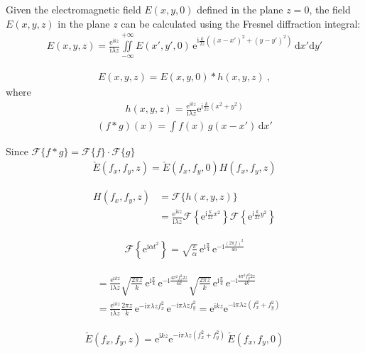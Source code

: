 \documentclass[a4paper,11pt,onecolumn]{scrartcl}
\renewcommand{\i}{\mathrm i}
\newcommand{\e}{\mathrm e}
\begin{document}
Given the electromagnetic field $E(x, y, 0)$ defined in the plane $z = 0$, the field $E(x,y,z)$ in the plane $z$ can be calculated using the Fresnel diffraction integral:
\begin{align}
E(x,y,z) = \frac{\mathrm e^{\i kz}}{\i\lambda z}\iint\limits_{-\infty}^{+\infty} E(x', y', 0)\,\e^{\i\frac{k}{2z}\left((x-x')^2 + (y-y')^2\right)\;}\mathrm dx'\mathrm dy'
\end{align}

\begin{align}
E(x,y,z) = E(x, y, 0) 
* h(x,y,z)\ ,
\end{align}
where
\begin{align}
h(x, y, z) = \frac{\mathrm e^{\i kz}}{\i\lambda z}\e^{\i\frac{k}{2z}(x^2 + y^2)}
\end{align}
\begin{align}
(f * g)(x) = \int f(x)\,g(x - x')\,\mathrm dx' 
\end{align}

Since ${\mathcal {F}}\{f*g\}={\mathcal {F}}\{f\}\cdot {\mathcal {F}}\{g\}$
\begin{align}
\check{E}(f_x, f_y, z) = \check{E}(f_x, f_y, 0)H(f_x, f_y, z)
\end{align}

\begin{align}
H(f_x, f_y, z) &= \mathcal F\{h(x, y,z)\} \\
&= \frac{\mathrm e^{\i kz}}{\i\lambda z} \mathcal F\left\{\e^{\i\frac{k}{2z}x^2 }\right\}\mathcal F\left\{\e^{\i\frac{k}{2z}y^2 }\right\}
\end{align}

\begin{align}
\mathcal F\left\{\e^{\i\alpha t^2 }\right\} = \sqrt{\frac{\pi}{\alpha}} \,\e^{\i\frac{\pi}{4}}\,\e^{-\i\frac{(2\pi f)^2}{4\alpha}}
\end{align}

\begin{align}
&= \frac{\mathrm e^{\i kz}}{\i\lambda z}\sqrt{\frac{2\pi z}{k}} \,\e^{\i\frac{\pi}{4}}\,\e^{-\i\frac{4\pi^2 f_x^2 2z}{4k}} \sqrt{\frac{2\pi z}{k}} \,\e^{\i\frac{\pi}{4}}\,\e^{-\i\frac{4\pi^2 f_y^2 2z}{4k}} \\
&=  \frac{\mathrm e^{\i kz}}{\i\lambda z}\frac{2\pi z}{k}\,\e^{-\i\pi\lambda z f_x^2}\,\e^{-\i\pi\lambda z f_y^2} = \e^{\i kz}\e^{-\i\pi\lambda z(f_x^2 + f_y^2)}
\end{align}

\begin{align}
\check{E}(f_x, f_y, z) = \e^{\i kz}\e^{-\i\pi\lambda z(f_x^2+f_y^2)}\,\check{E}(f_x, f_y, 0)
\end{align}
\end{document}

